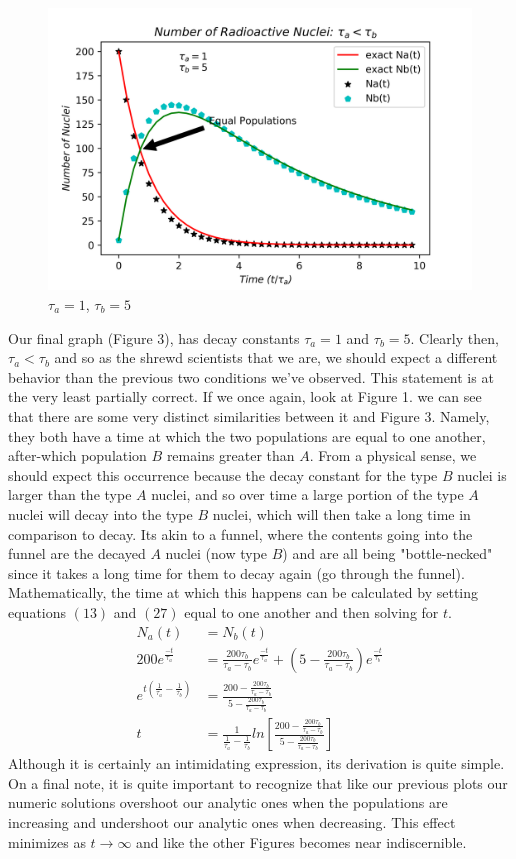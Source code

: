 \documentclass[twocolumn]{article}
\begin{document}
\begin{figure}[h]
\caption{$\tau_a = 1$, $\tau_b = 5$}
\centering
\includegraphics[scale=.6]{Radioactive_DecayAlessthanB}
\end{figure}
Our final graph (Figure 3), has decay constants $\tau_a=1$ and $\tau_b=5$. Clearly then, $\tau_a<\tau_b$ and so as the shrewd scientists that we are, we should expect a different behavior than the previous two conditions we've observed. This statement is at the very least partially correct. If we once again, look at Figure 1. we can see that there are some very distinct similarities between it and Figure 3. Namely, they both have a time at which the two populations are equal to one another, after-which population $B$ remains greater than $A$. From a physical sense, we should expect this occurrence because the decay constant for the type $B$ nuclei is larger than the type $A$ nuclei, and so over time a large portion of the type $A$ nuclei will decay into the type $B$ nuclei, which will then take a long time in comparison to decay. Its akin to a funnel, where the contents going into the funnel are the decayed $A$ nuclei (now type $B$) and are all being "bottle-necked" since it takes a long time for them to decay again (go through the funnel). Mathematically, the time at which this happens can be calculated by setting equations $(13)$ and $(27)$ equal to one another and then solving for $t$.
	\begin{align}
	N_a(t)&=N_b(t)\\
	200e^{\frac{-t}{\tau_a}}&=\frac{200\tau_b}{\tau_a-\tau_b}e^{\frac{-t}{\tau_a}}+\left(5-\frac{200\tau_b}{\tau_a-\tau_b}\right)e^{\frac{-t}{\tau_b}}\\
	e^{t\left(\frac{1}{\tau_a}-\frac{1}{\tau_b}\right)}&=\frac{200-\frac{200\tau_b}{\tau_a-\tau_b}}{5-\frac{200\tau_b}{\tau_a-\tau_b}}\\
	t&=\frac{1}{\frac{1}{\tau_a}-\frac{1}{\tau_b}}ln\left[\frac{200-\frac{200\tau_b}{\tau_a-\tau_b}}{5-\frac{200\tau_b}{\tau_a-\tau_b}}\right]	
	\end{align}
Although it is certainly an intimidating expression, its derivation is quite simple. On a final note, it is quite important to recognize that like our previous plots our numeric solutions overshoot our analytic ones when the populations are increasing and undershoot our analytic ones when decreasing. This effect minimizes as $t\to\infty$ and like the other Figures becomes near indiscernible. 
\end{document}
